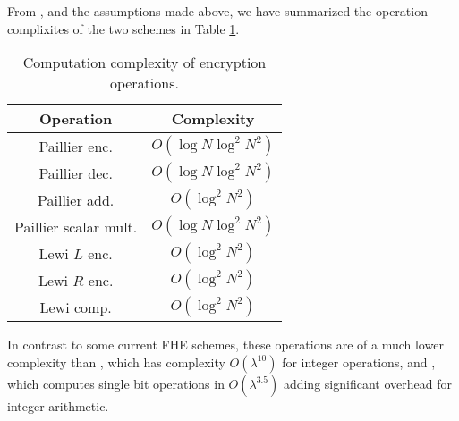 \documentclass[letterpaper, 10 pt, journal, twoside]{ieeetran}  %
\providecommand{\DIFadd}[1]{{\protect\color{blue}\uwave{#1}}} %
\providecommand{\DIFdel}[1]{{\protect\color{red}\sout{#1}}}                      %
\providecommand{\DIFaddFL}[1]{\DIFadd{#1}} %
\providecommand{\DIFdelFL}[1]{\DIFdel{#1}} %
\providecommand{\DIFaddbeginFL}{} %
\providecommand{\DIFaddendFL}{} %
\providecommand{\DIFdelbeginFL}{} %
\providecommand{\DIFdelendFL}{} %
\begin{document}
From \cite{paillierPublicKeyCryptosystemsBased1999,lewiOrderRevealingEncryptionNew2016}, and the assumptions made above, we have summarized the operation complixites of the two schemes in Table \ref{tab:complex_ops}.
\begin{table}[tb]
   \centering
   \caption{Computation complexity of encryption operations.}
   \label{tab:complex_ops}
   \begin{tabular}{ |c|c| }
      \hline
      \textbf{Operation} & \textbf{Complexity} \\ 
      \hline
      Paillier enc. & \DIFdelbeginFL \DIFdelFL{$O(\log{N}\log^2{N^2})$ }\DIFdelendFL \DIFaddbeginFL \DIFaddFL{$O(\log^3{N})$ }\DIFaddendFL \\ 
      Paillier dec. & \DIFdelbeginFL \DIFdelFL{$O(\log{N}\log^2{N^2})$ }\DIFdelendFL \DIFaddbeginFL \DIFaddFL{$O(\log^3{N})$ }\DIFaddendFL \\ 
      Paillier add. & \DIFdelbeginFL \DIFdelFL{$O(\log^2{N^2})$ }\DIFdelendFL \DIFaddbeginFL \DIFaddFL{$O(\log^2{N})$ }\DIFaddendFL \\ 
      Paillier scalar mult. & \DIFdelbeginFL \DIFdelFL{$O(\log{N}\log^2{N^2})$ }\DIFdelendFL \DIFaddbeginFL \DIFaddFL{$O(\log^3{N})$ }\DIFaddendFL \\ 
      Lewi $L$ enc. & \DIFdelbeginFL \DIFdelFL{$O(\log^2{N^2})$ }\DIFdelendFL \DIFaddbeginFL \DIFaddFL{$O(\log^2{N})$ }\DIFaddendFL \\ 
      Lewi $R$ enc. & \DIFdelbeginFL \DIFdelFL{$O(\log^2{N^2})$ }\DIFdelendFL \DIFaddbeginFL \DIFaddFL{$O(\log^2{N})$ }\DIFaddendFL \\ 
      Lewi comp. & \DIFdelbeginFL \DIFdelFL{$O(\log^2{N^2})$ }\DIFdelendFL \DIFaddbeginFL \DIFaddFL{$O(\log^2{N})$ }\DIFaddendFL \\ 
      \hline
   \end{tabular}
   \vspace{-5pt}
\end{table}
In contrast to some current FHE schemes, these operations are of a much lower complexity than \cite{vandijkFullyHomomorphicEncryption2010a}, which has complexity $O(\lambda^{10})$ for integer operations, and \cite{stehleFasterFullyHomomorphic2010}, which computes single bit operations in $O(\lambda^{3.5})$ adding significant overhead for integer arithmetic.
\end{document}

